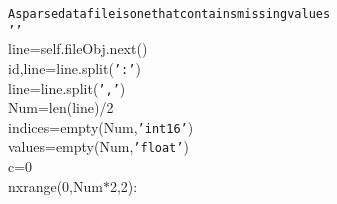 {{\begin{tabbing}
{\texttt{\hspace{72pt}A\hspace{6pt}sparse\hspace{6pt}data\hspace{6pt}file\hspace{6pt}is\hspace{6pt}one\hspace{6pt}that\hspace{6pt}contains\hspace{6pt}missing\hspace{6pt}values}}\\
{\texttt{\hspace{48pt}{'}}}{\texttt{{'}{'}}}\\
\hspace{48pt}line\hspace{6pt}=\hspace{6pt}self.fileObj.next()\\
\hspace{48pt}id,line\hspace{6pt}=\hspace{6pt}line.split({\texttt{{'}:{'}}})\\
\hspace{48pt}line\hspace{6pt}=\hspace{6pt}line.split({\texttt{{'},{'}}})\\
\hspace{48pt}Num\hspace{6pt}=\hspace{6pt}len(line)/2\\
\hspace{48pt}indices\hspace{6pt}=\hspace{6pt}empty(Num,{\texttt{{'}int16{'}}})\\
\hspace{48pt}values\hspace{6pt}=\hspace{6pt}empty(Num,{\texttt{{'}float{'}}})\\
\hspace{48pt}c\hspace{6pt}=\hspace{6pt}0\\
\hspace{6pt}n\hspace{6pt}xrange(0,Num$\ast$2,2):\\

\end{tabbing}}}

